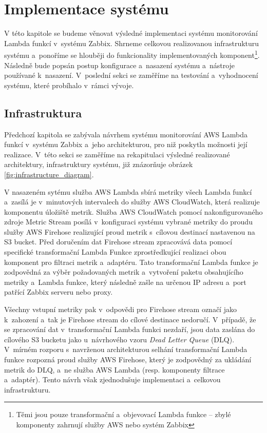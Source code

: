 \documentclass[czech, ing, kiv, he, iso690]{fasthesis}
\begin{document}
\chapter{Implementace systému}
\label{ch:implementace}

V této kapitole se budeme věnovat výsledné implementaci systému monitorování Lambda funkcí v~systému Zabbix. Shrneme celkovou realizovanou infrastrukturu systému a~ponoříme se hlouběji do funkcionality implementovaných komponent\footnote{Těmi jsou pouze transformační a~objevovací Lambda funkce -- zbylé komponenty zahrnují služby AWS nebo systém Zabbix}. Následně bude popsán postup konfigurace a~nasazení systému a~nástroje používané k~nasazení. V~poslední sekci se zaměříme na testování a~vyhodnocení systému, které probíhalo v~rámci vývoje.

\section{Infrastruktura}

Předchozí kapitola se zabývala návrhem systému monitorování AWS Lambda funkcí v~systému Zabbix a~jeho architekturou, pro niž poskytla možnosti její realizace. V~této sekci se zaměříme na rekapitulaci výsledné realizované architektury, infrastruktury systému, již znázorňuje obrázek \ref{fig:infrastructure_diagram}.

V nasazeném sytému služba AWS Lambda sbírá metriky všech Lambda funkcí a~zasílá je v~minutových intervalech do služby AWS CloudWatch, která realizuje komponentu úložiště metrik. Služba AWS CloudWatch pomocí nakonfigurovaného zdroje Metric Stream posílá v~konfiguraci systému vybrané metriky do proudu služby AWS Firehose realizující proud metrik s~cílovou destinací nastavenou na S3 bucket. Před doručením dat Firehose stream zpracovává data pomocí specifické transformační Lambda Funkce zprostředkující realizaci obou komponent pro filtraci metrik a~adaptéru. Tato transformační Lambda funkce je zodpovědná za výběr požadovaných metrik a~vytvoření paketu obsahujícího metriky a~Lambda funkce, který následně zašle na určenou IP adresu a~port patřící Zabbix serveru nebo proxy. 

Všechny vstupní metriky pak v~odpovědi pro Firehose stream označí jako k~zahození a~tak je Firehose stream do cílové destinace nedoručí. V~případě, že se zpracování dat v~transformační Lambda funkci nezdaří, jsou data zaslána do cílového S3 bucketu jako u~návrhového vzoru \emph{Dead Letter Queue} (DLQ). V~mírném rozporu s~navrženou architekturou selhání transformační Lambda funkce rozpozná proud služby AWS Firehose, který je zodpovědný za ukládání metrik do DLQ, a~ne služba AWS Lambda (resp. komponenty filtrace a~adaptér). Tento návrh však zjednodušuje implementaci a~celkovou infrastrukturu. 
\end{document}
